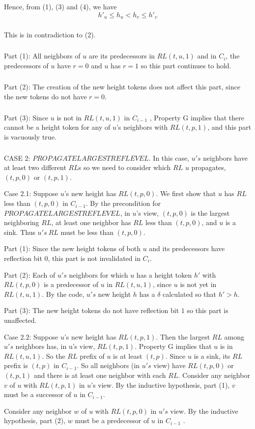 Hence, from (1), (3) and (4), we have
\begin{equation}
h'_u \leq h_u < h_v \leq h'_v
\end{equation}
\subparagraph{}This is in contradiction to (2).
\subparagraph{}Part (1): All neighbors of $u$ are its predecessors in $RL (t, u, 1)$ and in $C_i$, the predecessors of $u$ have $r = 0$ and $u$ has $r = 1$ so this part continues to hold.
\subparagraph{}Part (2): The creation of the new height tokens does not affect this part, since the new tokens do not have $r = 0$.
\subparagraph{}Part (3): Since $u$ is not in $RL (t, u, 1)$ in $C_{i-1}$ , Property G implies that there cannot be a height token for any of $u$'s neighbors with $RL (t, p, 1)$, and this part is vacuously true.
\subparagraph{}CASE 2: $PROPAGATELARGESTREFLEVEL$. In this case, $u's$ neighbors have at least two different $RL$s so we need to consider which $RL$ $u$ propagates, $(t, p, 0)$ or $(t, p, 1)$.

Case 2.1: Suppose $u$'s new height has $RL (t, p, 0)$. We first show that $u$ has $RL$ less than $(t, p, 0)$ in $C_{i-1}$. By the precondition for $PROPAGATELARGESTREFLEVEL$, in $u$'s view, $(t, p, 0)$ is the largest neighboring $RL$, at least one neighbor has $RL$ less than $(t, p, 0)$, and $u$ is a sink. Thus $u's~RL$ must be less than $(t, p, 0)$.

Part (1): Since the new height tokens of both $u$ and its predecessors have reflection bit $0$, this part is not invalidated in $C_i$.

Part (2): Each of $u's$ neighbors for which $u$ has a height token $h'$ with $RL (t, p, 0)$ is a predecessor of $u$ in $RL (t, u, 1)$, since $u$ is not yet in $RL (t, u, 1)$. By the code, $u's$ new height $h$ has a $\delta$ calculated so that $h' > h$.

Part (3): The new height tokens do not have reflection bit $1$ so this part is unaffected.

Case 2.2: Suppose $u$'s new height has $RL (t, p, 1)$. Then the largest $RL$ among $u's$ neighbors has, in u's view, $RL (t, p, 1)$. Property G implies that $u$ is in $RL (t, u, 1)$. So the $RL$ prefix of $u$ is at least $(t, p)$. Since $u$ is a sink, its $RL$ prefix is $(t, p)$ in $C_{i-1}$. So all neighbors (in $u's$ view) have $RL (t, p, 0)$ or $(t, p, 1)$ and there is at least one neighbor with each $RL$. Consider any neighbor $v$ of $u$ with $RL (t, p, 1)$ in $u$'s view. By the inductive hypothesis, part (1), $v$ must be a successor of $u$ in $C_{i-1}$.

Consider any neighbor $w$ of $u$ with $RL (t, p, 0)$ in $u's$ view. By the inductive hypothesis, part (2), $w$ must be a predecessor of $u$ in $C_{i-1}$ .

